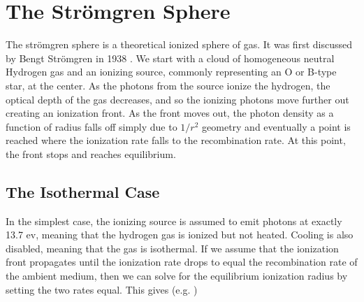 \section{The Str\"omgren Sphere}
\label{sec:stromgren}

The str\"omgren sphere is a theoretical ionized sphere of gas. It was first discussed by Bengt Str\"omgren in 1938 \citep{stromgren39}. We start with a cloud of homogeneous neutral Hydrogen gas and an ionizing source, commonly representing an O or B-type star, at the center. As the photons from the source ionize the hydrogen, the optical depth of the gas decreases, and so the ionizing photons move further out creating an ionization front. As the front moves out, the photon density as a function of radius falls off simply due to $1/r^2$ geometry and eventually a point is reached where the ionization rate falls to the recombination rate. At this point, the front stops and reaches equilibrium.

%
%
%
%

\subsection{The Isothermal Case}
\label{sec:isostromgren}

In the simplest case, the ionizing source is assumed to emit photons at exactly 13.7 ev, meaning that the hydrogen gas is ionized but not heated. Cooling is also disabled, meaning that the gas is isothermal. If we assume that the ionization front propagates until the ionization rate drops to equal the recombination rate of the ambient medium, then we can solve for the equilibrium ionization radius by setting the two rates equal. This gives (e.g. \citep{tielens05})

